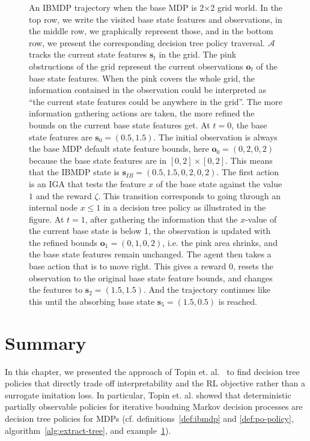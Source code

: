 \begin{figure}
\begin{tikzpicture}[scale=0.6]
    
\end{tikzpicture}
\caption{An IBMDP trajectory when the base MDP is 2$\times$2 grid world. In the top row, we write the visited base state features and observations, in the middle row, we graphically represent those, and in the bottom row, we present the corresponding decision tree policy traversal.
$\mathcal{A}$ tracks the current state features $\boldsymbol{s}_t$ in the grid.
The pink obstructions of the grid represent the current observations $\boldsymbol{o}_t$ of the base state features.
When the pink covers the whole grid, the information contained in the observation could be interpreted as ``the current state features could be anywhere in the grid''.
The more information gathering actions are taken, the more refined the bounds on the current base state features get.
At $t=0$, the base state features are $\boldsymbol{s}_0 = (0.5, 1.5)$. 
The initial observation is always the base MDP default state feature bounds, here $\boldsymbol{o}_0=(0, 2, 0, 2)$ because the base state features are in $[0, 2] \times [0, 2]$.
This means that the IBMDP state is $\boldsymbol{s}_{IB} = (0.5, 1.5, 0, 2, 0, 2)$.
The first action is an IGA that tests the feature $x$ of the base state against the value $1$ and the reward $\zeta$. 
This transition corresponds to going through an internal node $ x\leq 1$ in a decision tree policy as illustrated in the figure. 
At $t=1$, after gathering the information that the $x$-value of the current base state is below 1, the observation is updated with the refined bounds $\boldsymbol{o}_1=(0, 1, 0, 2)$, i.e. the pink area shrinks, and the base state features remain unchanged.
The agent then takes a base action that is to move right. 
This gives a reward 0, resets the observation to the original base state feature bounds, and changes the features to $\boldsymbol{s}_2=(1.5, 1.5)$. And the trajectory continues like this until the absorbing base state $\boldsymbol{s}_5=(1.5, 0.5)$ is reached.}
\label{example:ibmdp}
\end{figure}

\section{Summary}
In this chapter, we presented the approach of Topin et. al.~\cite{topin2021iterative} to find decision tree policies that directly trade off interpretability and the RL objective rather than a surrogate imitation loss.
In particular, Topin et. al. showed that deterministic partially observable policies for iterative boudning Markov decision processes are decision tree policies for MDPs (cf. definitions~\ref{def:ibmdp} and \ref{def:po-policy}, algorithm~\ref{alg:extract-tree}, and example~\ref{example:ibmdp}).

